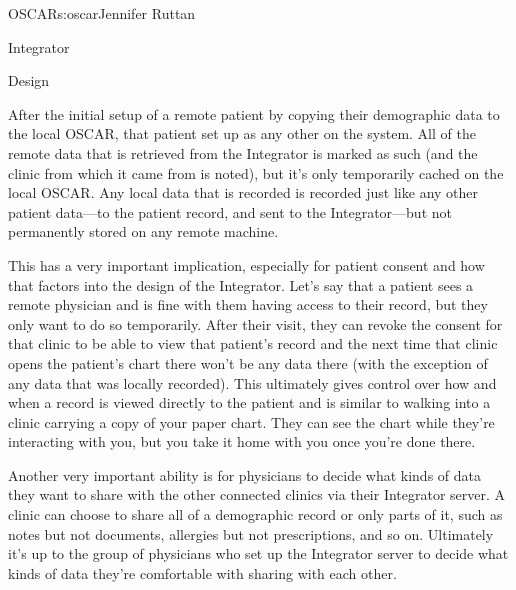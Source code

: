 \begin{aosachapter}{OSCAR}{s:oscar}{Jennifer Ruttan}
\begin{aosasect1}{Integrator}
\begin{aosasect2}{Design}

After the initial setup of a remote patient by copying their
demographic data to the local OSCAR, that patient set up as any other
on the system. All of the remote data that is retrieved from the
Integrator is marked as such (and the clinic from which it came from
is noted), but it's only temporarily cached on the local OSCAR. Any
local data that is recorded is recorded just like any other patient
data---to the patient record, and sent to the Integrator---but not
permanently stored on any remote machine.


This has a very important implication, especially for patient consent
and how that factors into the design of the Integrator. Let's say that
a patient sees a remote physician and is fine with them having access
to their record, but they only want to do so temporarily. After their
visit, they can revoke the consent for that clinic to be able to view
that patient's record and the next time that clinic opens the
patient's chart there won't be any data there (with the exception of
any data that was locally recorded). This ultimately gives control
over how and when a record is viewed directly to the patient and is
similar to walking into a clinic carrying a copy of your paper
chart. They can see the chart while they're interacting with you, but
you take it home with you once you're done there.


Another very important ability is for physicians to decide what kinds
of data they want to share with the other connected clinics via their
Integrator server. A clinic can choose to share all of a demographic
record or only parts of it, such as notes but not documents, allergies
but not prescriptions, and so on. Ultimately it's up to the group of
physicians who set up the Integrator server to decide what kinds of
data they're comfortable with sharing with each other.


\end{aosasect2}
\end{aosasect1}
\end{aosachapter}
